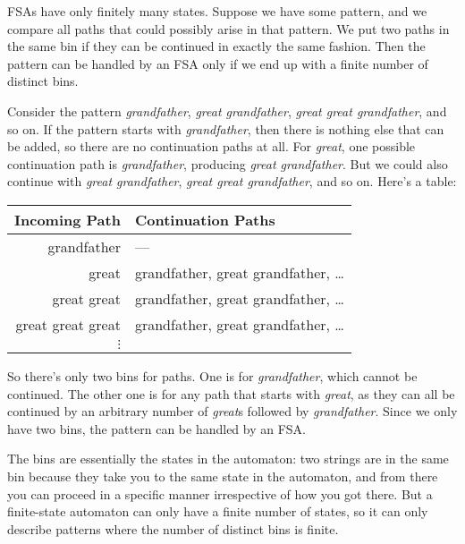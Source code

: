 FSAs have only finitely many states.
Suppose we have some pattern, and we compare all paths that could possibly arise in that pattern.
We put two paths in the same bin if they can be continued in exactly the same fashion.
Then the pattern can be handled by an FSA only if we end up with a finite number of distinct bins.
%
\begin{examplebox}
    Consider the pattern \emph{grandfather}, \emph{great grandfather}, \emph{great great grandfather}, and so on.
    If the pattern starts with \emph{grandfather}, then there is nothing else that can be added, so there are no continuation paths at all.
    For \emph{great}, one possible continuation path is \emph{grandfather}, producing \emph{great grandfather}.
    But we could also continue with \emph{great grandfather}, \emph{great great grandfather}, and so on.
    Here's a table:
    \begin{center}
        \begin{tabular}{rl}
            \toprule
            \textbf{Incoming Path} & \textbf{Continuation Paths}\\
            \midrule
            grandfather & ---\\
            great & grandfather, great grandfather, \ldots\\
            great great & grandfather, great grandfather, \ldots\\
            great great great & grandfather, great grandfather, \ldots\\
            $\vdots$
            \\
            \bottomrule
        \end{tabular}
    \end{center}
    So there's only two bins for paths.
    One is for \emph{grandfather}, which cannot be continued.
    The other one is for any path that starts with \emph{great}, as they can all be continued by an arbitrary number of \emph{great}s followed by \emph{grandfather}.
    Since we only have two bins, the pattern can be handled by an FSA\@.
\end{examplebox}

The bins are essentially the states in the automaton: two strings are in the same bin because they take you to the same state in the automaton, and from there you can proceed in a specific manner irrespective of how you got there.
But a finite-state automaton can only have a finite number of states, so it can only describe patterns where the number of distinct bins is finite.

